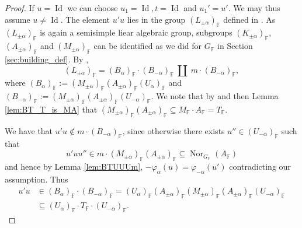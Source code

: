 \documentclass[12pt]{amsart}
\newcommand{\F}{\mathbb{F} }
\numberwithin{equation}{section}
\theoremstyle{remark} %
\begin{document}
		\begin{proof}
			If $u = \operatorname{Id}$ we can choose $u_1 = \operatorname{Id}, t=\operatorname{Id}$ and $u_1' = u'$. We may thus assume $u \neq \operatorname{Id}$. The element $u'u$ lies in the group $(L_{\pm \alpha})_\F$ defined in \cite[Section \ref{I-sec:rank1}]{AppAGRCF}. As $(L_{\pm \alpha})_\F$ is again a semisimple liear algebraic group, subgroups $(K_{\pm \alpha})_\F$, $(A_{\pm \alpha})_\F$ and $(M_{\pm \alpha})_\F$ can be identified as we did for $G_\F$ in Section \ref{sec:building_def}. By \cite[Corollary \ref{I-cor:levi_Bruhat_alternative}]{AppAGRCF},
			$$
			(L_{\pm \alpha})_\F = (B_{\alpha})_\F \cdot (B_{-\alpha})_\F  \ \amalg \   m \cdot (B_{ -\alpha})_\F,
			$$
			where $(B_{\alpha})_\F := (M_{\pm \alpha})_\F (A_{\pm \alpha})_\F (U_\alpha)_\F$ and $(B_{-\alpha})_\F := (M_{\pm \alpha})_\F (A_{\pm \alpha})_\F (U_{-\alpha})_\F$. We note that by \cite[Lemma \ref{I-lem:levi_fixes_A}]{AppAGRCF} and then Lemma \ref{lem:BT_T_is_MA} that $(M_{\pm \alpha})_\F(A_{\pm \alpha})_\F \subseteq M_\F \cdot A_\F = T_\F %
			$. 
			
			We have that $u'u \notin m \cdot (B_{-\alpha})_\F$, since otherwise there exists $u'' \in (U_{-\alpha})_\F$ such that
			$$
			u'uu'' \in m \cdot (M_{\pm \alpha})_\F (A_{\pm \alpha})_\F  \subseteq \operatorname{Nor}_{G_\F}(A_\F)
			$$
			and hence by Lemma \ref{lem:BTUUUm}, $-\varphi_\alpha(u) = \varphi_{-\alpha}(u')$ contradicting our assumption. Thus
			\begin{align*}
				u'u &\in (B_\alpha)_\F \cdot (B_{-\alpha})_\F = (U_{\alpha})_\F (A_{\pm \alpha})_\F (M_{\pm \alpha})_\F (A_{\pm \alpha})_\F (U_{-\alpha})_\F \\
				& \subseteq (U_{\alpha})_\F \cdot T_\F %
				\cdot (U_{-\alpha})_\F. 
			\end{align*}
			

\end{proof}
\end{document}
